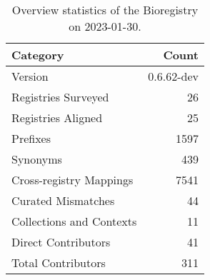 \begin{table}
\centering
\caption{Overview statistics of the Bioregistry on 2023-01-30.}
\label{tab:bioregistry-summary}
\begin{tabular}{lr}
\toprule
                Category &      Count \\
\midrule
                 Version & 0.6.62-dev \\
     Registries Surveyed &         26 \\
      Registries Aligned &         25 \\
                Prefixes &       1597 \\
                Synonyms &        439 \\
 Cross-registry Mappings &       7541 \\
      Curated Mismatches &         44 \\
Collections and Contexts &         11 \\
     Direct Contributors &         41 \\
      Total Contributors &        311 \\
\bottomrule
\end{tabular}
\end{table}
